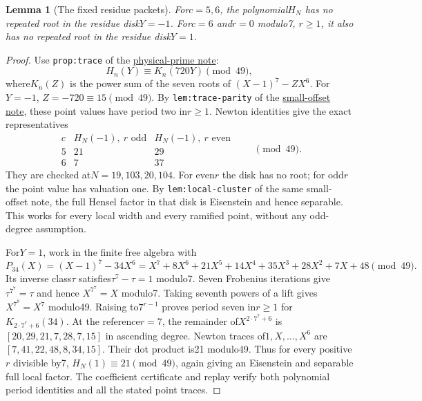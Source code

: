 \documentclass[11pt]{article}
\newtheorem{lemma}{Lemma}\newtheorem{theorem}[lemma]{Theorem}
\begin{document}
\begin{lemma}[The fixed residue packets]\label{lem:fixed-packets}
For$c=5,6$, the polynomial$H_N$ has no repeated root in the
residue disk$Y=-1$.
For$c=6$ and$r=0$ modulo7, $r\ge1$, it also has no repeated root
in the residue disk$Y=1$.
\end{lemma}
\begin{proof}
Use \texttt{prop:trace} of the
\href{PHYSICAL_PRIME_TOTAL_DEGREE_REDUCTION.tex}{physical-prime note}:
\[
 H_n(Y)\equiv K_n(720Y)\pmod{49},
\]
where$K_n(Z)$ is the power sum of the seven roots of
$(X-1)^7-ZX^6$.
For$Y=-1$, $Z=-720\equiv15\pmod{49}$.
By \texttt{lem:trace-parity} of the
\href{GAP_SIX_SMALL_OFFSET_FAMILIES.tex}{small-offset note},
these point values have period two in$r\ge1$.
Newton identities give the exact representatives
\[
\begin{array}{c|cc}
c&H_N(-1),\ r\text{ odd}&H_N(-1),\ r\text{ even}\\\hline
5&21&29\\
6&7&37
\end{array}\qquad\pmod{49}.                                \tag{10}
\]
They are checked at$N=19,103,20,104$.
For even$r$ the disk has no root; for odd$r$ the point value
has valuation one.
By \texttt{lem:local-cluster} of the same small-offset note,
the full Hensel factor in that disk is Eisenstein and hence
separable. This works for every local width and every ramified
point, without any odd-degree assumption.

For$Y=1$, work in the finite free algebra with
\[
 P_{34}(X)=(X-1)^7-34X^6
 =X^7+8X^6+21X^5+14X^4+35X^3+28X^2+7X+48\pmod{49}.
\]
Its inverse class$\tau$ satisfies$\tau^7-\tau=1$ modulo7.
Seven Frobenius iterations give$\tau^{7^7}=\tau$ and hence
$X^{7^7}=X$ modulo7.
Taking seventh powers of a lift gives$X^{7^8}=X^7$ modulo49.
Raising to$7^{r-1}$ proves period seven in$r\ge1$ for
$K_{2\cdot7^r+6}(34)$.
At the reference$r=7$, the remainder of$X^{2\cdot7^7+6}$ is
$[20,29,21,7,28,7,15]$ in ascending degree.
Newton traces of$1,X,\ldots,X^6$ are
$[7,41,22,48,8,34,15]$.
Their dot product is21 modulo49.
Thus for every positive$r$ divisible by7,
$H_N(1)\equiv21\pmod{49}$, again giving an Eisenstein and
separable full local factor.
The coefficient certificate and replay verify both polynomial
period identities and all the stated point traces.
\end{proof}
\end{document}
